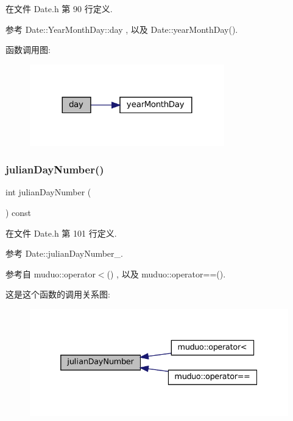 在文件 Date.\+h 第 90 行定义.



参考 Date\+::\+Year\+Month\+Day\+::day , 以及 Date\+::year\+Month\+Day().

函数调用图\+:
\nopagebreak
\begin{figure}[H]
\begin{center}
\leavevmode
\includegraphics[width=239pt]{classmuduo_1_1Date_a912344e9b0a67db916e2bac3c43337dc_cgraph}
\end{center}
\end{figure}
\mbox{\label{classmuduo_1_1Date_a65f8b93cc331cca79e2d364710128383}} 
\subsubsection{\texorpdfstring{julian\+Day\+Number()}{julianDayNumber()}}
{\footnotesize\ttfamily int julian\+Day\+Number (\begin{DoxyParamCaption}{ }\end{DoxyParamCaption}) const\hspace{0.3cm}{\ttfamily [inline]}}



在文件 Date.\+h 第 101 行定义.



参考 Date\+::julian\+Day\+Number\+\_\+.



参考自 muduo\+::operator$<$() , 以及 muduo\+::operator==().

这是这个函数的调用关系图\+:
\nopagebreak
\begin{figure}[H]
\begin{center}
\leavevmode
\includegraphics[width=332pt]{classmuduo_1_1Date_a65f8b93cc331cca79e2d364710128383_icgraph}
\end{center}
\end{figure}
\mbox{\label{classmuduo_1_1Date_a9418bae7320038816691fbb13ce3b90a}} 
